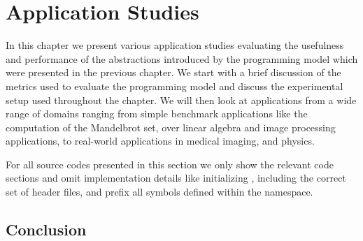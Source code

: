 \chapter{Application Studies}
\label{chapter:skelcl-evaluation}
%
%

In this chapter we present various application studies evaluating the usefulness and performance of the abstractions introduced by the \SkelCL programming model which were presented in the previous chapter.
We start with a brief discussion of the metrics used to evaluate the \SkelCL programming model and discuss the experimental setup used throughout the chapter.
We will then look at applications from a wide range of domains ranging from simple benchmark applications like the computation of the Mandelbrot set, over linear algebra and image processing applications, to real-world applications in medical imaging, and physics.

For all source codes presented in this section we only show the relevant code sections and omit implementation details like initializing \SkelCL, including the correct set of header files, and prefix all symbols defined within the  namespace.















% 

\section{Conclusion}

